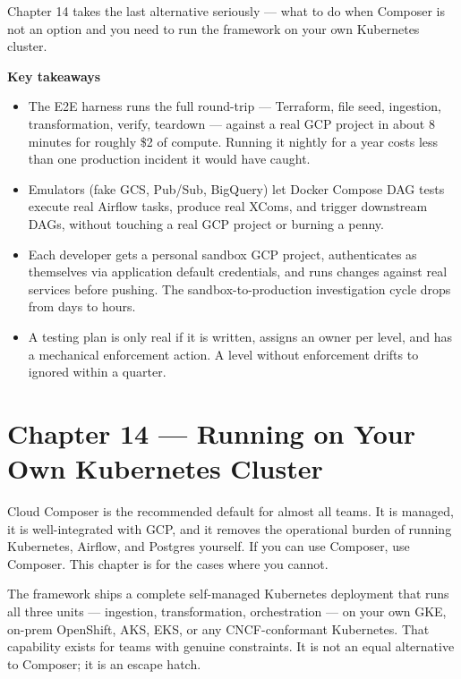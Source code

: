 \documentclass[
  11pt,
  british,
  oneside]{book}
\begin{document}
Chapter 14 takes the last alternative seriously --- what to do when
Composer is not an option and you need to run the framework on your own
Kubernetes cluster.

\begin{takeaways}
\textbf{Key takeaways}
\begin{itemize}
  \item The E2E harness runs the full round-trip — Terraform, file seed, ingestion, transformation, verify, teardown — against a real GCP project in about 8 minutes for roughly \$2 of compute. Running it nightly for a year costs less than one production incident it would have caught.
  \item Emulators (fake GCS, Pub/Sub, BigQuery) let Docker Compose DAG tests execute real Airflow tasks, produce real XComs, and trigger downstream DAGs, without touching a real GCP project or burning a penny.
  \item Each developer gets a personal sandbox GCP project, authenticates as themselves via application default credentials, and runs changes against real services before pushing. The sandbox-to-production investigation cycle drops from days to hours.
  \item A testing plan is only real if it is written, assigns an owner per level, and has a mechanical enforcement action. A level without enforcement drifts to ignored within a quarter.
\end{itemize}
\end{takeaways}

\newpage

\hypertarget{chapter-14-running-on-your-own-kubernetes-cluster}{%
\chapter{Chapter 14 --- Running on Your Own Kubernetes
Cluster}\label{chapter-14-running-on-your-own-kubernetes-cluster}}

Cloud Composer is the recommended default for almost all teams. It is
managed, it is well-integrated with GCP, and it removes the operational
burden of running Kubernetes, Airflow, and Postgres yourself. If you can
use Composer, use Composer. This chapter is for the cases where you
cannot.

The framework ships a complete self-managed Kubernetes
deployment that runs all three units --- ingestion, transformation,
orchestration --- on your own GKE, on-prem OpenShift, AKS, EKS, or any
CNCF-conformant Kubernetes. That capability exists for teams with
genuine constraints. It is not an equal alternative to Composer; it is
an escape hatch.
\end{document}
